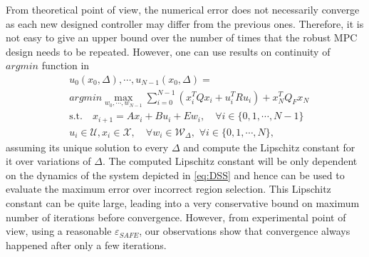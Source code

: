 {From theoretical point of view, the numerical error does not necessarily converge as each new designed controller may differ from the previous ones. Therefore, it is not easy to give an upper bound over the number of times that the robust MPC design needs to be repeated. However, one can use results on continuity of $argmin$ function in 
\begin{align*}
\label{eq:argmin}
&u_0(x_0,\Delta),\cdots,u_{N-1}(x_0,\Delta)=\\
&argmin \max_{w_0,\cdots,w_{N-1}} \sum_{i=0}^{N-1}(x_i^TQx_i+u_i^TRu_i) + x_N^TQ_Fx_N\nonumber\\
&\text{s.t.} \quad x_{i+1}=Ax_i+Bu_i + E w_i, \quad\forall i\in\{0,1,\cdots,N-1\}\nonumber\\
&u_i\in\mathcal{U},x_i\in\mathcal{X},\quad \forall w_i\in\mathcal{W}_{\Delta},\,\,\forall i\in\{0,1,\cdots,N\},
\end{align*}
 assuming its unique solution to every $\Delta$ and compute the Lipschitz constant for it over variations of $\Delta$. The computed Lipschitz constant will be only dependent on the dynamics of the system depicted in \autoref{eq:DSS} and hence can be used to evaluate the maximum error over incorrect region selection. This Lipschitz constant can be quite large, leading into a very conservative bound on maximum number of iterations before convergence. However, from experimental point of view, using a reasonable $\varepsilon_{SAFE}$, our observations show that convergence always happened after only a few iterations.
}
